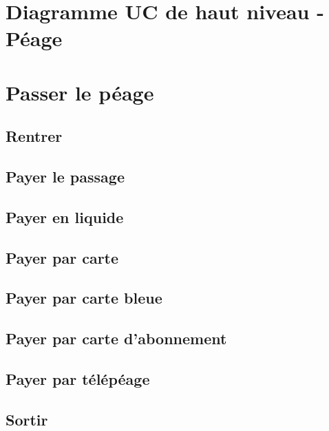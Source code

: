 \label{Cap:TD2}

\section{Diagramme UC de haut niveau - Péage}
    

\newpage
\section{Passer le péage}\label{sec:passer}
    

\newpage

\subsection{Rentrer} \label{subsec:rentre}
    

\newpage

\subsection{Payer le passage} \label{subsec:paie}
    
 
 \newpage   
\subsection{Payer en liquide} \label{subsec:paieLiquide}
    
\newpage   
\subsection{Payer par carte} 
    
    
    
\newpage
\subsection{Payer par carte bleue} \label{subsec:paierBleu}
    
\newpage

\subsection{Payer par carte d'abonnement} \label{subsec:paierAbonement}
    
    
\newpage  
\subsection{Payer par télépéage} \label{subsec:paierTelepeage}
    

\newpage    
\subsection{Sortir} \label{subsec:sortir}
    

\newpage